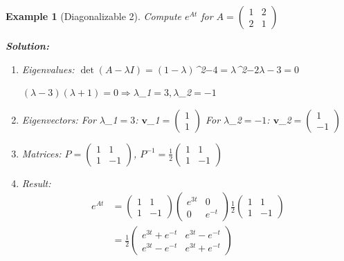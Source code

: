 \documentclass[12pt]{article}
\newtheorem{example}{Example}
\begin{document}
\begin{example}[Diagonalizable 2]
Compute $e^{At}$ for $A = \begin{pmatrix} 1 & 2 \\ 2 & 1 \end{pmatrix}$

\textbf{Solution:}
\begin{enumerate}
\item Eigenvalues: $\det(A - \lambda I) = (1-\lambda)$^{2}$ - 4 = \lambda$^{2}$ - 2\lambda - 3 = 0$

$(\lambda - 3)(\lambda + 1) = 0 \Rightarrow \lambda$_{1}$ = 3, \lambda$_{2}$ = -1$

\item Eigenvectors:
For $\lambda$_{1}$ = 3$: $\mathbf{v}$_{1}$ = \begin{pmatrix} 1 \\ 1 \end{pmatrix}$
For $\lambda$_{2}$ = -1$: $\mathbf{v}$_{2}$ = \begin{pmatrix} 1 \\ -1 \end{pmatrix}$

\item Matrices:
$P = \begin{pmatrix} 1 & 1 \\ 1 & -1 \end{pmatrix}$, $P^{-1} = \frac{1}{2}\begin{pmatrix} 1 & 1 \\ 1 & -1 \end{pmatrix}$

\item Result:
\begin{align}
e^{At} &= \begin{pmatrix} 1 & 1 \\ 1 & -1 \end{pmatrix}\begin{pmatrix} e^{3t} & 0 \\ 0 & e^{-t} \end{pmatrix}\frac{1}{2}\begin{pmatrix} 1 & 1 \\ 1 & -1 \end{pmatrix} \\
&= \frac{1}{2}\begin{pmatrix} e^{3t} + e^{-t} & e^{3t} - e^{-t} \\ e^{3t} - e^{-t} & e^{3t} + e^{-t} \end{pmatrix}
\end{align}
\end{enumerate}
\end{example}
\end{document}
